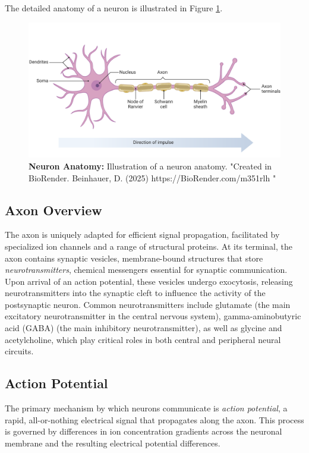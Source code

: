 The detailed anatomy of a neuron is illustrated in Figure \ref{fig:neuron}.

\begin{figure}
    \centering
    \includegraphics[width=\linewidth]{img/neuron_anatomy.pdf}
    \caption{\textbf{Neuron Anatomy:} Illustration of a neuron anatomy. 
    "Created in BioRender. Beinhauer, D. (2025) https://BioRender.com/m351rlh "}
    \label{fig:neuron}
\end{figure}


\subsection{Axon Overview}
\label{subsec:axon}

The axon is uniquely adapted for efficient signal propagation, facilitated by specialized
ion channels and a range of structural proteins. At its terminal, the axon contains
synaptic vesicles, membrane-bound structures that store \emph{neurotransmitters}, chemical messengers
essential for synaptic communication. Upon arrival of an action potential, these vesicles
undergo exocytosis, releasing neurotransmitters into the synaptic cleft to influence the
activity of the postsynaptic neuron. Common neurotransmitters include glutamate (the main excitatory neurotransmitter in the central nervous system), 
gamma-aminobutyric acid (GABA) (the main inhibitory neurotransmitter),
as well as glycine and acetylcholine, which play critical roles in both central and
peripheral neural circuits.

\subsection{Action Potential}
\label{subsec:action_potential}
The primary mechanism by which neurons communicate is \emph{action potential}, a rapid, 
all-or-nothing electrical signal that propagates along the axon. This process is governed
by differences in ion concentration gradients across the neuronal membrane and the resulting
electrical potential differences.

